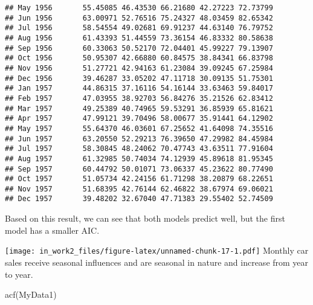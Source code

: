 \documentclass[
]{article}
\newenvironment{Shaded}{\begin{snugshade}}{\end{snugshade}}
\newcommand{\AttributeTok}[1]{\textcolor[rgb]{0.77,0.63,0.00}{#1}}
\newcommand{\DecValTok}[1]{\textcolor[rgb]{0.00,0.00,0.81}{#1}}
\newcommand{\FunctionTok}[1]{\textcolor[rgb]{0.00,0.00,0.00}{#1}}
\newcommand{\NormalTok}[1]{#1}
\newcommand{\OtherTok}[1]{\textcolor[rgb]{0.56,0.35,0.01}{#1}}
\newcommand{\SpecialCharTok}[1]{\textcolor[rgb]{0.00,0.00,0.00}{#1}}
\newcommand{\StringTok}[1]{\textcolor[rgb]{0.31,0.60,0.02}{#1}}
\begin{document}
\begin{verbatim}
## May 1956       55.45085 46.43530 66.21680 42.27223 72.73799
## Jun 1956       63.00971 52.76516 75.24327 48.03459 82.65342
## Jul 1956       58.54554 49.02681 69.91237 44.63140 76.79752
## Aug 1956       61.43393 51.44559 73.36154 46.83332 80.58638
## Sep 1956       60.33063 50.52170 72.04401 45.99227 79.13907
## Oct 1956       50.95307 42.66880 60.84575 38.84341 66.83798
## Nov 1956       51.27721 42.94163 61.23084 39.09245 67.25984
## Dec 1956       39.46287 33.05202 47.11718 30.09135 51.75301
## Jan 1957       44.86315 37.16116 54.16144 33.63463 59.84017
## Feb 1957       47.03955 38.92703 56.84276 35.21526 62.83412
## Mar 1957       49.25389 40.74965 59.53291 36.85939 65.81621
## Apr 1957       47.99121 39.70496 58.00677 35.91441 64.12902
## May 1957       55.64370 46.03601 67.25652 41.64098 74.35516
## Jun 1957       63.20550 52.29213 76.39650 47.29982 84.45984
## Jul 1957       58.30845 48.24062 70.47743 43.63511 77.91604
## Aug 1957       61.32985 50.74034 74.12939 45.89618 81.95345
## Sep 1957       60.44792 50.01071 73.06337 45.23622 80.77490
## Oct 1957       51.05734 42.24156 61.71298 38.20879 68.22651
## Nov 1957       51.68395 42.76144 62.46822 38.67974 69.06021
## Dec 1957       39.48202 32.67040 47.71383 29.55402 52.74509
\end{verbatim}

Based on this result, we can see that both models predict well, but the
first model has a smaller AIC.

\begin{Shaded}
\end{Shaded}

\texttt{[image: in\_work2\_files/figure-latex/unnamed-chunk-17-1.pdf]}
Monthly car sales receive seasonal influences and are seasonal in nature
and increase from year to year.

\begin{Shaded}
\begin{Highlighting}[]
\FunctionTok{acf}\NormalTok{(MyData1)}
\end{Highlighting}
\end{Shaded}
\end{document}
